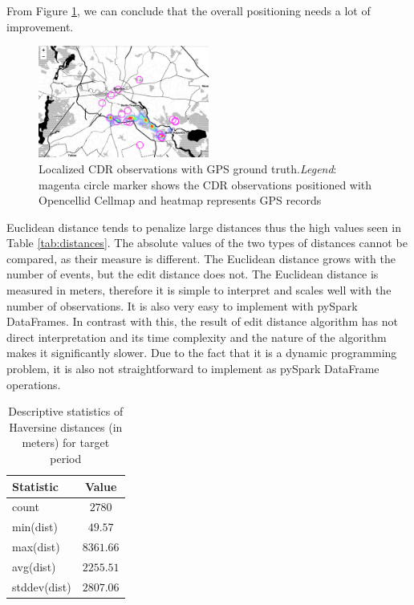 From Figure \ref{fig:traj}, we can conclude that the overall positioning needs a lot of improvement. 

\begin{figure}[h]
    \centering
    \includegraphics[width=0.5\textwidth]{images/traj.png}
    \caption{Localized CDR observations with GPS ground truth.\textit{Legend}: magenta circle marker shows the CDR observations positioned with Opencellid Cellmap and heatmap represents GPS records}
    \label{fig:traj}
\end{figure}

Euclidean distance tends to penalize large distances thus the high values seen in Table \ref{tab:distances}. The absolute values of the two types of distances cannot be compared, as their measure is different. The Euclidean distance grows with the number of events, but the edit distance does not. 
The Euclidean distance is measured in meters, therefore it is simple to interpret and scales well with the number of observations. It is also very easy to implement with pySpark DataFrames. In contrast with this, the result of edit distance algorithm has not direct interpretation and its time complexity and the nature of the algorithm makes it significantly slower. Due to the fact that it is a dynamic programming problem, it is also not straightforward to implement as pySpark DataFrame operations.

\begin{table}[h]
    \centering
    \begin{tabular}{|l|c|}
        \hline
        \textbf{Statistic} & \textbf{Value} \\
        \hline 
        count & $2780$ \\
        \hline
        min(dist) &  $49.57$\\
        \hline
        max(dist) &   $8361.66$\\
        \hline
        avg(dist) &  $2255.51$\\
        \hline
        stddev(dist) &  $2807.06$\\
        \hline
    \end{tabular}
    \caption{Descriptive statistics of Haversine distances (in meters) for target period}
    \label{tab:dist_stats}
\end{table}


